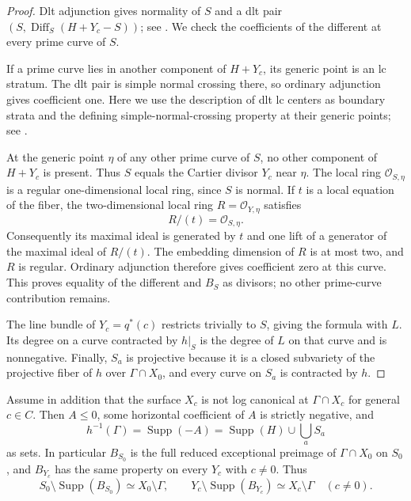 \begin{proof}
Dlt adjunction gives normality of $S$ and a dlt pair
$(S,\operatorname{Diff}_S(H+Y_c-S))$; see
\cite[Lemma~10.2]{Fujino2011}.  We check the coefficients of the different
at every prime curve of $S$.

If a prime curve lies in another component of $H+Y_c$, its generic point
is an lc stratum.  The dlt pair is simple normal crossing there, so ordinary
adjunction gives coefficient one.  Here we use the description of dlt lc
centers as boundary strata and the defining simple-normal-crossing property
at their generic points; see
\cite[Definition~11.5 and (11.10.4)]{Kollar2023Families}.

At the generic point $\eta$ of any other prime curve of $S$, no other
component of $H+Y_c$ is present.  Thus $S$ equals the Cartier divisor
$Y_c$ near $\eta$.  The local ring $\mathcal O_{S,\eta}$ is a regular
one-dimensional local ring, since $S$ is normal.  If $t$ is a local
equation of the fiber, the two-dimensional local ring
$R=\mathcal O_{Y,\eta}$ satisfies
\[
 R/(t)=\mathcal O_{S,\eta}.
\]
Consequently its maximal ideal is generated by $t$ and one lift of a
generator of the maximal ideal of $R/(t)$.  The embedding dimension of $R$
is at most two, and $R$ is regular.  Ordinary adjunction therefore gives
coefficient zero at this curve.  This proves equality of the different
and $B_S$ as divisors; no other prime-curve contribution remains.

The line bundle of $Y_c=q^*(c)$ restricts trivially to $S$, giving the
formula with $L$.  Its degree on a curve contracted by $h|_S$ is the degree
of $L$ on that curve and is nonnegative.  Finally, $S_a$ is projective
because it is a closed subvariety of the projective fiber of $h$ over
$\Gamma\cap X_0$, and every curve on $S_a$ is contracted by $h$.
\end{proof}

\begin{proposition}
\label{prop:full-exceptional-boundary}
Assume in addition that the surface $X_c$ is not log canonical at
$\Gamma\cap X_c$ for general $c\in C$.  Then $A\le0$, some horizontal coefficient of $A$ is
strictly negative, and
\[
 h^{-1}(\Gamma)=\operatorname{Supp}(-A)
              =\operatorname{Supp}(H)\cup\bigcup_a S_a
\]
as sets.  In particular $B_{S_0}$ is the full reduced exceptional
preimage of $\Gamma\cap X_0$ on $S_0$, and $B_{Y_c}$ has the same property
on every $Y_c$ with $c\ne0$.  Thus
\[
 S_0\setminus\operatorname{Supp}(B_{S_0})
       \simeq X_0\setminus\Gamma,
 \qquad
 Y_c\setminus\operatorname{Supp}(B_{Y_c})
       \simeq X_c\setminus\Gamma\quad(c\ne0).
\]
\end{proposition}

